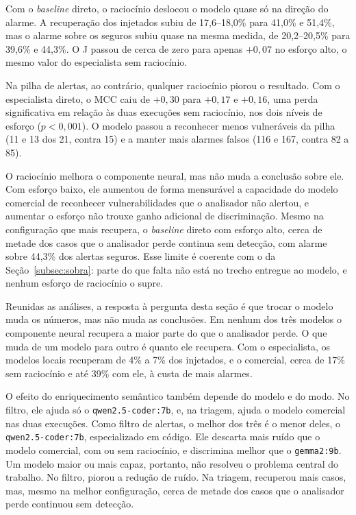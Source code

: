 Com o \textit{baseline} direto, o raciocínio deslocou o modelo quase só na direção do alarme. A recuperação dos injetados subiu de 17,6--18,0\% para 41,0\% e 51,4\%, mas o alarme sobre os seguros subiu quase na mesma medida, de 20,2--20,5\% para 39,6\% e 44,3\%. O J passou de cerca de zero para apenas $+0{,}07$ no esforço alto, o mesmo valor do especialista sem raciocínio.

Na pilha de alertas, ao contrário, qualquer raciocínio piorou o resultado. Com o especialista direto, o MCC caiu de $+0{,}30$ para $+0{,}17$ e $+0{,}16$, uma perda significativa em relação às duas execuções sem raciocínio, nos dois níveis de esforço ($p < 0{,}001$). O modelo passou a reconhecer menos vulneráveis da pilha (11 e 13 dos 21, contra 15) e a manter mais alarmes falsos (116 e 167, contra 82 a 85).

O raciocínio melhora o componente neural, mas não muda a conclusão sobre ele. Com esforço baixo, ele aumentou de forma mensurável a capacidade do modelo comercial de reconhecer vulnerabilidades que o analisador não alertou, e aumentar o esforço não trouxe ganho adicional de discriminação. Mesmo na configuração que mais recupera, o \textit{baseline} direto com esforço alto, cerca de metade dos casos que o analisador perde continua sem detecção, com alarme sobre 44,3\% dos alertas seguros. Esse limite é coerente com o da Seção~\ref{subsec:sobra}: parte do que falta não está no trecho entregue ao modelo, e nenhum esforço de raciocínio o supre.

Reunidas as análises, a resposta à pergunta desta seção é que trocar o modelo muda os números, mas não muda as conclusões. Em nenhum dos três modelos o componente neural recupera a maior parte do que o analisador perde. O que muda de um modelo para outro é quanto ele recupera. Com o especialista, os modelos locais recuperam de 4\% a 7\% dos injetados, e o comercial, cerca de 17\% sem raciocínio e até 39\% com ele, à custa de mais alarmes.

O efeito do enriquecimento semântico também depende do modelo e do modo. No filtro, ele ajuda só o \texttt{qwen2.5-coder:7b}, e, na triagem, ajuda o modelo comercial nas duas execuções. Como filtro de alertas, o melhor dos três é o menor deles, o \texttt{qwen2.5-coder:7b}, especializado em código. Ele descarta mais ruído que o modelo comercial, com ou sem raciocínio, e discrimina melhor que o \texttt{gemma2:9b}. Um modelo maior ou mais capaz, portanto, não resolveu o problema central do trabalho. No filtro, piorou a redução de ruído. Na triagem, recuperou mais casos, mas, mesmo na melhor configuração, cerca de metade dos casos que o analisador perde continuou sem detecção.


